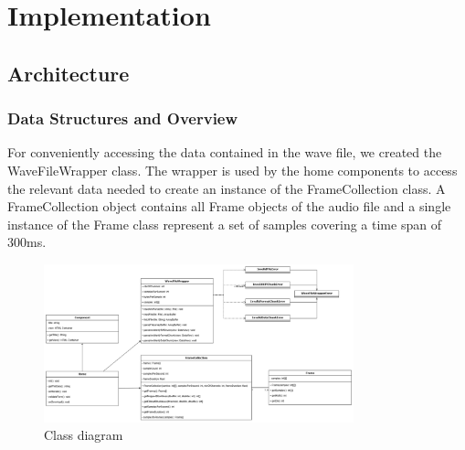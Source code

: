 \section{Implementation}\label{sec:implementation}

\subsection{Architecture}\label{subsec:architecture}

\subsubsection{Data Structures and Overview}
For conveniently accessing the data contained in the wave file, we created the WaveFileWrapper class.
The wrapper is used by the home components to access the relevant data needed to create an instance of the FrameCollection class.
A FrameCollection object contains all Frame objects of the audio file and a single instance of the Frame class represent a set of samples covering a time span of 300ms.

\begin{figure}[H]
    \centering
    \includegraphics[width=0.8\textwidth]{../assets/class_diagram.png}
    \caption{Class diagram}\label{fig:class-diagram}
\end{figure}

